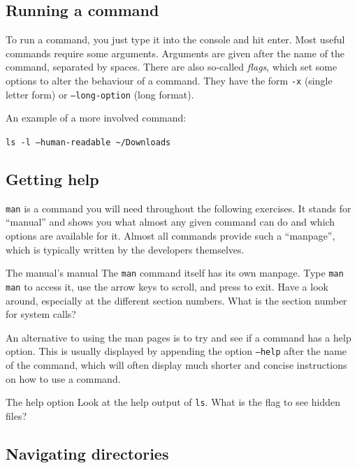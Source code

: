 \documentclass{TheAlternativeCourse}
\begin{document}
\subsection{Running a command}

To run a command, you just type it into the console and hit enter.  Most useful
commands require some arguments. Arguments are given after the name of the
command, separated by spaces. There are also so-called \emph{flags}, which set
some options to alter the behaviour of a command. They have the form
\texttt{-x} (single letter form) or \texttt{--long-option} (long format).

An example of a more involved command:

\begin{cmdbox}
\texttt{ls -l --human-readable \textasciitilde/Downloads}
\end{cmdbox}

\subsection{Getting help}

\texttt{man} is a command you will need throughout the following
exercises.  It stands for ``manual'' and shows you what almost any given
command can do and which options are available for it.  Almost all commands
provide such a ``manpage'', which is typically written by the developers
themselves.

\begin{exercisebox}{The manual's manual}
    The \texttt{man} command itself has its own manpage. Type \texttt{man man}
    to access it, use the arrow keys to scroll, and press  to exit.
    Have a look around, especially at the different section numbers.
    What is the section number for system calls?
\end{exercisebox}

An alternative to using the man pages is to try and see if a command has a help
option. This is usually displayed by appending the option \texttt{--help} after
the name of the command, which will often display much shorter and concise
instructions
on how to use a command.

\begin{exercisebox}{The help option}
    Look at the help output of \texttt{ls}. What is the flag to see hidden
    files?
\end{exercisebox}

\subsection{Navigating directories}
\end{document}
